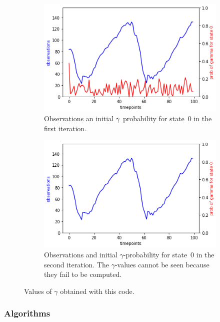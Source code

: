 \documentclass[twoside]{article}
\begin{document}
\begin{figure}[h]
  \centering
  \begin{subfigure}[h]{0.48\textwidth}
    \includegraphics[width=\textwidth]{images/external-python-left}
    \caption{Observations an initial $\gamma$~probability for state~$0$ in the first iteration.}\label{fig:external-python-left}
  \end{subfigure}
  \begin{subfigure}[h]{0.48\textwidth}
    \includegraphics[width=\textwidth]{images/external-python-right}
    \caption{Observations and initial $\gamma$-probability for state~$0$ in the second iteration. The $\gamma$-values cannot be seen because they fail to be computed.}\label{fig:external-python-right}
  \end{subfigure}
  \caption[gamma-external]{Values of $\gamma$ obtained with this code.}\label{fig:gamma-external}
\end{figure}

\subsubsection{Algorithms}\label{sec:algorithms-python-external-underflow}
\end{document}
